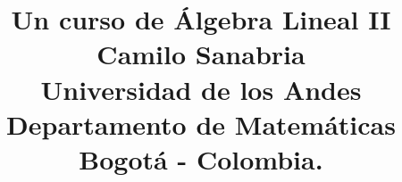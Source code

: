 \documentclass{book}
\title{{\Huge Un curso de Álgebra Lineal II}\\
\vspace{2cm}
Camilo Sanabria\\
\vspace{1cm}
Universidad de los Andes\\
Departamento de Matemáticas\\
Bogotá - Colombia.
}
\date{}
\begin{document}
\frontmatter
\maketitle
\tableofcontents
\listoffigures 

\mainmatter

\theoremstyle{plain} \newtheorem{teo}{Teorema}[chapter]
\theoremstyle{plain} \newtheorem{pro}[teo]{Propiedad}
\theoremstyle{plain} \newtheorem{prop}[teo]{Proposición}
\theoremstyle{plain} \newtheorem{coro}[teo]{Corolario}
\theoremstyle{plain} \newtheorem{lema}[teo]{Lema}
\theoremstyle{definition} \newtheorem{defn}[teo]{Definición}
\theoremstyle{definition} \newtheorem{obs}[teo]{Observación}
\theoremstyle{definition} \newtheorem{nota}[teo]{Notación}
\theoremstyle{definition} \newtheorem{ejem}[teo]{Ejemplo}

\newcommand{\dem}{\noindent\emph{Dem}. }











\backmatter
%
%
\printindex
\end{document}
